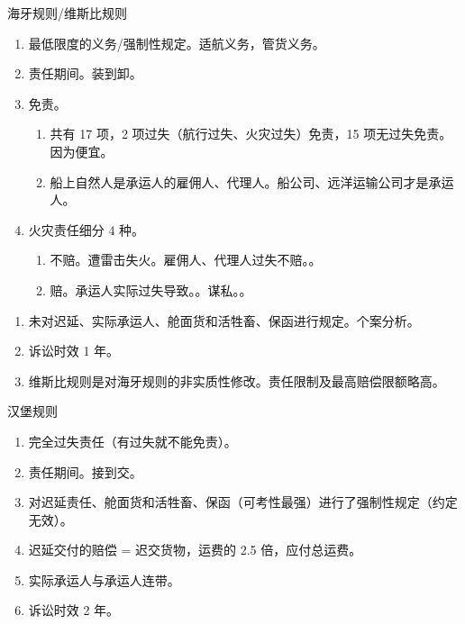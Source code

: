 \begin{enumerate}
\begin{enumerate}
\begin{kk}{海牙规则/维斯比规则}
\begin{enumerate}
                    \item 最低限度的义务/强制性规定。适航义务，管货义务。
                    \item 责任期间。装到卸。
                    \item 免责。
                          \begin{enumerate}
                            \item 共有 17 项，2 项过失（航行过失、火灾过失）免责，15 项无过失免责。因为便宜。
                            \item 船上自然人是承运人的雇佣人、代理人。船公司、远洋运输公司才是承运人。
                          \end{enumerate}
                    \item 火灾责任细分 4 种。
                          \begin{enumerate}
                            \item 不赔。\yi 遭雷击失火。\er 雇佣人、代理人过失不赔。。
                            \item 赔。\yi 承运人实际过失导致。。\er 谋私。。
                          \end{enumerate}
                  \end{enumerate}
                  \tcblower
                  \begin{enumerate}
                    \item 未对迟延、实际承运人、舱面货和活牲畜、保函进行规定。个案分析。
                    \item 诉讼时效 1 年。
                    \item 维斯比规则是对海牙规则的非实质性修改。责任限制及最高赔偿限额略高。
                  \end{enumerate}
                \end{kk}

                \begin{kk}{汉堡规则}
                  \begin{enumerate}
                    \item 完全过失责任（有过失就不能免责）。
                    \item 责任期间。接到交。
                    \item 对迟延责任、舱面货和活牲畜、保函（可考性最强）进行了强制性规定（约定无效）。
                    \item 迟延交付的赔偿 = 迟交货物，运费的 2.5 倍，\xydy 应付总运费。
                    \item 实际承运人与承运人连带。
                    \item 诉讼时效 2 年。
                  \end{enumerate}


\end{kk}
\end{enumerate}
\end{enumerate}
